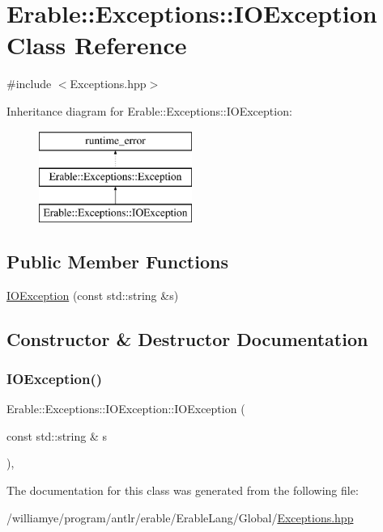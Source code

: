 \hypertarget{class_erable_1_1_exceptions_1_1_i_o_exception}{}\section{Erable\+::Exceptions\+::I\+O\+Exception Class Reference}
\label{class_erable_1_1_exceptions_1_1_i_o_exception}


{\ttfamily \#include $<$Exceptions.\+hpp$>$}

Inheritance diagram for Erable\+::Exceptions\+::I\+O\+Exception\+:\begin{figure}[H]
\begin{center}
\leavevmode
\includegraphics[height=3.000000cm]{class_erable_1_1_exceptions_1_1_i_o_exception}
\end{center}
\end{figure}
\subsection*{Public Member Functions}
\begin{DoxyCompactItemize}
\item 
\mbox{\hyperlink{class_erable_1_1_exceptions_1_1_i_o_exception_ab78834d3009e9e07c72b8af24c8ba21d}{I\+O\+Exception}} (const std\+::string \&s)
\end{DoxyCompactItemize}


\subsection{Constructor \& Destructor Documentation}
\mbox{\label{class_erable_1_1_exceptions_1_1_i_o_exception_ab78834d3009e9e07c72b8af24c8ba21d}} 
\subsubsection{\texorpdfstring{IOException()}{IOException()}}
{\footnotesize\ttfamily Erable\+::\+Exceptions\+::\+I\+O\+Exception\+::\+I\+O\+Exception (\begin{DoxyParamCaption}\item[{const std\+::string \&}]{s }\end{DoxyParamCaption})\hspace{0.3cm}{\ttfamily [inline]}, {\ttfamily [explicit]}}



The documentation for this class was generated from the following file\+:\begin{DoxyCompactItemize}
\item 
/williamye/program/antlr/erable/\+Erable\+Lang/\+Global/\mbox{\hyperlink{_exceptions_8hpp}{Exceptions.\+hpp}}\end{DoxyCompactItemize}
